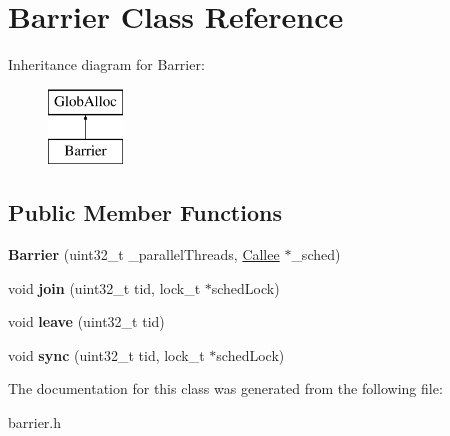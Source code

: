\hypertarget{classBarrier}{\section{Barrier Class Reference}
\label{classBarrier}
}
Inheritance diagram for Barrier\-:\begin{figure}[H]
\begin{center}
\leavevmode
\includegraphics[height=2.000000cm]{classBarrier}
\end{center}
\end{figure}
\subsection*{Public Member Functions}
\begin{DoxyCompactItemize}
\item 
\hypertarget{classBarrier_afba5acbf7c4c59a188b7095427d6bca8}{{\bfseries Barrier} (uint32\-\_\-t \-\_\-parallel\-Threads, \hyperlink{classCallee}{Callee} $\ast$\-\_\-sched)}\label{classBarrier_afba5acbf7c4c59a188b7095427d6bca8}

\item 
\hypertarget{classBarrier_acf3161220f8103268e839886aa5abd7e}{void {\bfseries join} (uint32\-\_\-t tid, lock\-\_\-t $\ast$sched\-Lock)}\label{classBarrier_acf3161220f8103268e839886aa5abd7e}

\item 
\hypertarget{classBarrier_a9f8323ec211fee7ab01ecd5a09915b15}{void {\bfseries leave} (uint32\-\_\-t tid)}\label{classBarrier_a9f8323ec211fee7ab01ecd5a09915b15}

\item 
\hypertarget{classBarrier_ade91fab85fc326b8484e9aa0e24c33c7}{void {\bfseries sync} (uint32\-\_\-t tid, lock\-\_\-t $\ast$sched\-Lock)}\label{classBarrier_ade91fab85fc326b8484e9aa0e24c33c7}

\end{DoxyCompactItemize}


The documentation for this class was generated from the following file\-:\begin{DoxyCompactItemize}
\item 
barrier.\-h\end{DoxyCompactItemize}
